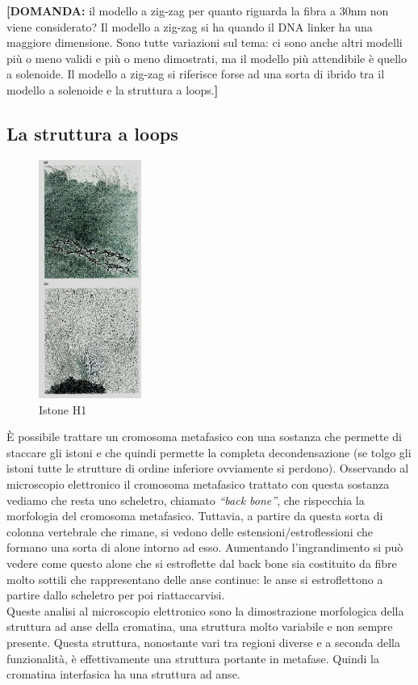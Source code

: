 \documentclass[11pt]{book}
\begin{document}
\textbf{[DOMANDA:} il modello a zig-zag per quanto riguarda la fibra a 30nm non viene considerato? Il modello a zig-zag si ha quando il DNA linker ha una maggiore dimensione. Sono tutte variazioni sul tema: ci sono anche altri modelli più o meno validi e più o meno dimostrati, ma il modello più attendibile è quello a solenoide. Il modello a zig-zag si riferisce forse ad una sorta di ibrido tra il modello a solenoide e la struttura a loops.\textbf{]}

\subsection{La struttura a loops}

\begin{figure}
    \includegraphics[width=0.30\textwidth]{img/25_backbone.png}
  \caption{Istone H1}
\end{figure}

È possibile trattare un cromosoma metafasico con una sostanza che permette di staccare gli istoni e che quindi permette la completa decondensazione (se tolgo gli istoni tutte le strutture di  ordine inferiore ovviamente si perdono). Osservando al microscopio elettronico il cromosoma metafasico trattato con questa sostanza vediamo che resta uno scheletro, chiamato \emph{``back bone''}, che rispecchia la morfologia del cromosoma metafasico. Tuttavia, a partire da questa sorta di colonna vertebrale che rimane, si vedono delle estensioni/estroflessioni che formano una sorta di alone intorno ad esso. Aumentando l’ingrandimento si può vedere come questo alone che si estroflette dal back bone sia costituito da fibre molto sottili che rappresentano delle anse continue: le anse si estroflettono a partire dallo scheletro per poi riattaccarvisi.\\
Queste analisi al microscopio elettronico sono la dimostrazione morfologica della struttura ad anse della cromatina, una struttura molto variabile e non sempre presente. Questa struttura, nonostante vari tra regioni diverse e a seconda della funzionalità, è effettivamente una struttura portante in metafase.
Quindi la cromatina interfasica ha una struttura ad anse.
\end{document}
